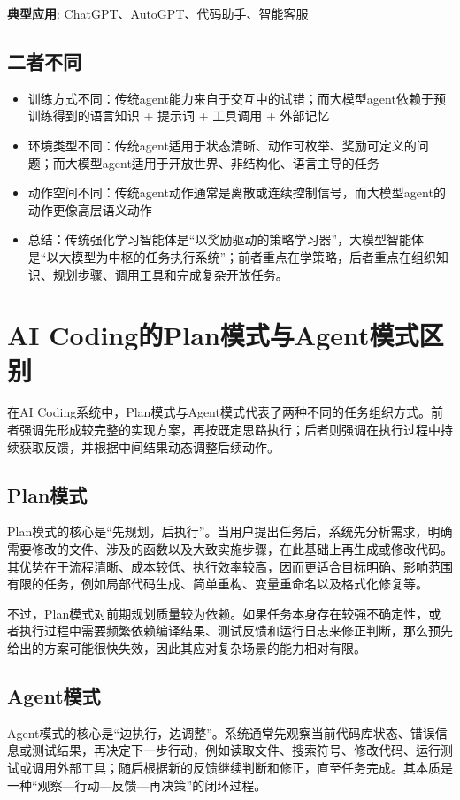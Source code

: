 \documentclass[UTF8]{ctexart}
\begin{document}
\textbf{典型应用}: ChatGPT、AutoGPT、代码助手、智能客服

\subsection{二者不同}
\begin{itemize}
\item[(1)]训练方式不同：传统agent能力来自于交互中的试错；而大模型agent依赖于预训练得到的语言知识 + 提示词 + 工具调用 + 外部记忆
\item[(2)]环境类型不同：传统agent适用于状态清晰、动作可枚举、奖励可定义的问题；而大模型agent适用于开放世界、非结构化、语言主导的任务
\item[(3)]动作空间不同：传统agent动作通常是离散或连续控制信号，而大模型agent的动作更像高层语义动作
\item[(4)]总结：传统强化学习智能体是“以奖励驱动的策略学习器”，大模型智能体是“以大模型为中枢的任务执行系统”；前者重点在学策略，后者重点在组织知识、规划步骤、调用工具和完成复杂开放任务。
\end{itemize}
\section{AI Coding的Plan模式与Agent模式区别}

在AI Coding系统中，Plan模式与Agent模式代表了两种不同的任务组织方式。前者强调先形成较完整的实现方案，再按既定思路执行；后者则强调在执行过程中持续获取反馈，并根据中间结果动态调整后续动作。

\subsection{Plan模式}

Plan模式的核心是“先规划，后执行”。当用户提出任务后，系统先分析需求，明确需要修改的文件、涉及的函数以及大致实施步骤，在此基础上再生成或修改代码。其优势在于流程清晰、成本较低、执行效率较高，因而更适合目标明确、影响范围有限的任务，例如局部代码生成、简单重构、变量重命名以及格式化修复等。

不过，Plan模式对前期规划质量较为依赖。如果任务本身存在较强不确定性，或者执行过程中需要频繁依赖编译结果、测试反馈和运行日志来修正判断，那么预先给出的方案可能很快失效，因此其应对复杂场景的能力相对有限。

\subsection{Agent模式}

Agent模式的核心是“边执行，边调整”。系统通常先观察当前代码库状态、错误信息或测试结果，再决定下一步行动，例如读取文件、搜索符号、修改代码、运行测试或调用外部工具；随后根据新的反馈继续判断和修正，直至任务完成。其本质是一种“观察—行动—反馈—再决策”的闭环过程。
\end{document}
